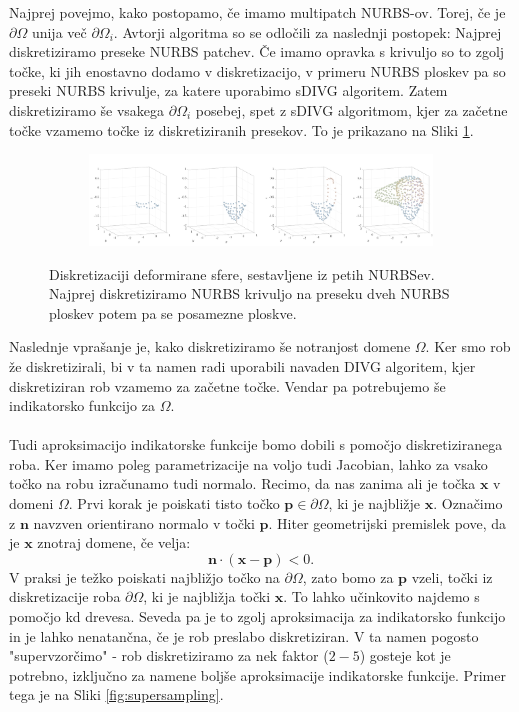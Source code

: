 \documentclass{article}
\begin{document}
Najprej povejmo, kako postopamo, če imamo multipatch NURBS-ov. Torej, če je $\partial \Omega$ unija več $\partial \Omega_i$. Avtorji algoritma so se odločili za naslednji postopek: Najprej diskretiziramo preseke NURBS patchev. Če imamo opravka s krivuljo so to zgolj točke, ki jih enostavno dodamo v diskretizacijo, v primeru NURBS ploskev pa so preseki NURBS krivulje, za katere uporabimo sDIVG algoritem. Zatem diskretiziramo še vsakega $\partial \Omega_i$ posebej, spet z sDIVG algoritmom, kjer za začetne točke vzamemo točke iz diskretiziranih presekov. To je prikazano na Sliki \ref{fig:nurbsmultipatch}.
\begin{figure}[H]
\centering
\begin{subfigure}{.8\textwidth}
\includegraphics[width=\linewidth]{Slike/nurbsmultipatch.png}
\end{subfigure}
\caption{Diskretizaciji deformirane sfere, sestavljene iz petih NURBSev. Najprej diskretiziramo NURBS krivuljo na preseku dveh NURBS ploskev potem pa se posamezne ploskve.}
\label{fig:nurbsmultipatch}
\end{figure}
Naslednje vprašanje je, kako diskretiziramo še notranjost domene $\Omega$. Ker smo rob že diskretizirali, bi v ta namen radi uporabili navaden DIVG algoritem, kjer diskretiziran rob vzamemo za začetne točke. Vendar pa potrebujemo še indikatorsko funkcijo za $\Omega$.
\\
\\
Tudi aproksimacijo indikatorske funkcije bomo dobili s pomočjo diskretiziranega roba. Ker imamo poleg parametrizacije na voljo tudi Jacobian, lahko za vsako točko na robu izračunamo tudi normalo. Recimo, da nas zanima ali je točka $\textbf{x}$ v domeni $\Omega$. Prvi korak je poiskati tisto točko $\textbf{p} \in \partial \Omega$, ki je najbližje $\textbf{x}$. Označimo z $\textbf{n}$ navzven orientirano normalo v točki $\textbf{p}$. Hiter geometrijski premislek pove, da je $\textbf{x}$ znotraj domene, če velja:
\begin{equation}
\textbf{n} \cdot (\textbf{x} - \textbf{p}) < 0.
\end{equation}
V praksi je težko poiskati najbližjo točko na $\partial \Omega$, zato bomo za $\textbf{p}$ vzeli, točki iz diskretizacije roba $\partial \Omega$, ki je najbližja točki $\textbf{x}$. To lahko učinkovito najdemo s pomočjo kd drevesa. Seveda pa je to zgolj aproksimacija za indikatorsko funkcijo in je lahko nenatančna, če je rob preslabo diskretiziran. V ta namen pogosto "supervzorčimo" - rob diskretiziramo za nek faktor ($2-5$) gosteje kot je potrebno, izključno za namene boljše aproksimacije indikatorske funkcije. Primer tega je na Sliki \ref{fig:supersampling}.
\end{document}
